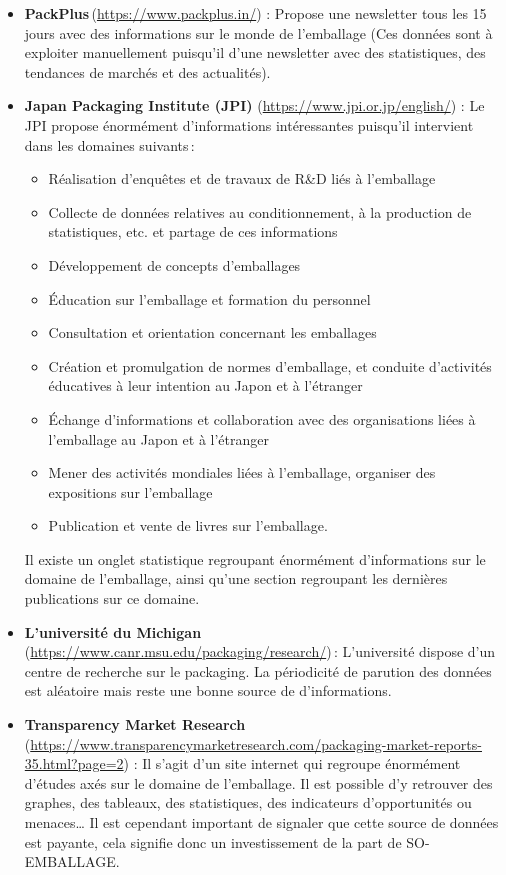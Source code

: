 \begin{itemize}[label=\textbullet, font=\LARGE \color{listGreen}]	
    \item \textbf{PackPlus} (\url{https://www.packplus.in/}) : Propose une newsletter tous les 15 jours avec des informations sur le monde de l’emballage (Ces données sont à exploiter manuellement puisqu’il d’une newsletter avec des statistiques, des tendances de marchés et des actualités).
	\item \textbf{Japan Packaging Institute (JPI)} (\url{https://www.jpi.or.jp/english/}) : Le JPI propose énormément d’informations intéressantes puisqu’il intervient dans les domaines suivants :   
	\begin{itemize}[label=\textbullet, font=\LARGE \color{listGrey}]	
		\item Réalisation d'enquêtes et de travaux de R\&D liés à l'emballage 
		\item Collecte de données relatives au conditionnement, à la production de statistiques, etc. et partage de ces informations 
		\item Développement de concepts d'emballages
		\item Éducation sur l'emballage et formation du personnel 
		\item Consultation et orientation concernant les emballages  
		\item Création et promulgation de normes d'emballage, et conduite d'activités éducatives à leur intention au Japon et à l'étranger 
		\item Échange d'informations et collaboration avec des organisations liées à l'emballage au Japon et à l'étranger 
		\item Mener des activités mondiales liées à l'emballage, organiser des expositions sur l'emballage  
		\item Publication et vente de livres sur l'emballage. 
	\end{itemize}
	Il existe un onglet statistique regroupant énormément d’informations sur le domaine de l’emballage, ainsi qu’une section regroupant les dernières publications sur ce domaine.
	\item\textbf{ L’université du Michigan} (\url{https://www.canr.msu.edu/packaging/research/}) : L’université dispose d’un centre de recherche sur le packaging. La périodicité de parution des données est aléatoire mais reste une bonne source de d’informations. 
	\item \textbf{Transparency Market Research} (\url{https://www.transparencymarketresearch.com/packaging-market-reports-35.html?page=2}) : Il s’agit d’un site internet qui regroupe énormément d’études axés sur le domaine de l’emballage. Il est possible d’y retrouver des graphes, des tableaux, des statistiques, des indicateurs d’opportunités ou menaces… Il est cependant important de signaler que cette source de données est payante, cela signifie donc un investissement de la part de SO-EMBALLAGE. 

\end{itemize}

